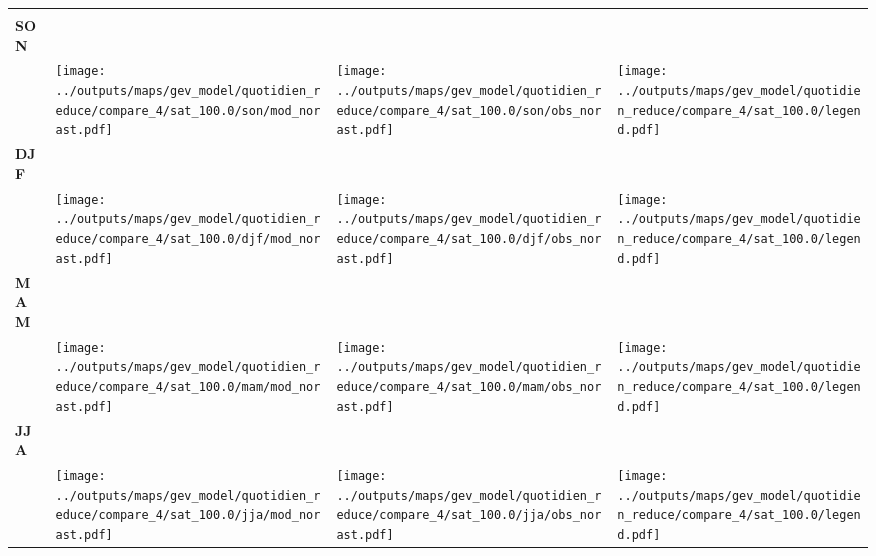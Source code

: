 \documentclass[
  letterpaper,
  DIV=11,
  numbers=noendperiod]{scrartcl}
\begin{document}
\begin{longtable*}{m{2.0cm}m{7.9cm}m{7.9cm}m{1cm}}
 & \centering  & \centering  & \tabularnewline
\centering \textbf{SON} \\[0.2em] \begin{tabular}{r@{\hspace{0.2em}}l}\end{tabular} & \centering \texttt{[image: ../outputs/maps/gev\_model/quotidien\_reduce/compare\_4/sat\_100.0/son/mod\_norast.pdf]} & \centering \texttt{[image: ../outputs/maps/gev\_model/quotidien\_reduce/compare\_4/sat\_100.0/son/obs\_norast.pdf]} & \centering \texttt{[image: ../outputs/maps/gev\_model/quotidien\_reduce/compare\_4/sat\_100.0/legend.pdf]} \tabularnewline
\centering \textbf{DJF} \\[0.2em] \begin{tabular}{r@{\hspace{0.2em}}l}\end{tabular} & \centering \texttt{[image: ../outputs/maps/gev\_model/quotidien\_reduce/compare\_4/sat\_100.0/djf/mod\_norast.pdf]} & \centering \texttt{[image: ../outputs/maps/gev\_model/quotidien\_reduce/compare\_4/sat\_100.0/djf/obs\_norast.pdf]} & \centering \texttt{[image: ../outputs/maps/gev\_model/quotidien\_reduce/compare\_4/sat\_100.0/legend.pdf]} \tabularnewline
\centering \textbf{MAM} \\[0.2em] \begin{tabular}{r@{\hspace{0.2em}}l}\end{tabular} & \centering \texttt{[image: ../outputs/maps/gev\_model/quotidien\_reduce/compare\_4/sat\_100.0/mam/mod\_norast.pdf]} & \centering \texttt{[image: ../outputs/maps/gev\_model/quotidien\_reduce/compare\_4/sat\_100.0/mam/obs\_norast.pdf]} & \centering \texttt{[image: ../outputs/maps/gev\_model/quotidien\_reduce/compare\_4/sat\_100.0/legend.pdf]} \tabularnewline
\centering \textbf{JJA} \\[0.2em] \begin{tabular}{r@{\hspace{0.2em}}l}\end{tabular} & \centering \texttt{[image: ../outputs/maps/gev\_model/quotidien\_reduce/compare\_4/sat\_100.0/jja/mod\_norast.pdf]} & \centering \texttt{[image: ../outputs/maps/gev\_model/quotidien\_reduce/compare\_4/sat\_100.0/jja/obs\_norast.pdf]} & \centering \texttt{[image: ../outputs/maps/gev\_model/quotidien\_reduce/compare\_4/sat\_100.0/legend.pdf]} \tabularnewline
\end{longtable*}
\end{document}
